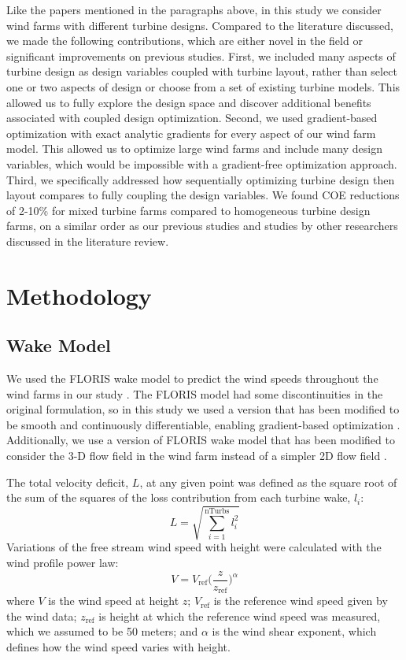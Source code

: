 \documentclass[WESD, manuscript]{copernicus}
\begin{document}
Like the papers mentioned in the paragraphs above, in this study we consider wind farms with different turbine designs. 
Compared to the literature discussed, we made the following contributions, which are either novel in the field or significant improvements on previous studies.
First, we included many aspects of turbine design as design variables coupled with turbine layout, rather than select one or two aspects of design or choose from a set of existing turbine models. This allowed us to fully explore the design space and discover additional benefits associated with coupled design optimization.
Second, we used gradient-based optimization with exact analytic gradients for every aspect of our wind farm model. This allowed us to optimize large wind farms and include many design variables, which would be impossible with a gradient-free optimization approach.
Third, we specifically addressed how sequentially optimizing turbine design then layout compares to fully coupling the design variables.
%
We found COE reductions of 2-10\% for mixed turbine farms compared to homogeneous turbine design farms, on a similar order as our previous studies and studies by other researchers discussed in the literature review.








\section{Methodology}

	\subsection{Wake Model}
	We used the FLORIS wake model to predict the wind speeds throughout the wind farms in our study \citep{gebraad2016wind}. 
The FLORIS model had some discontinuities in the original formulation, so in this study we used a version that has been modified to be smooth and continuously differentiable, enabling gradient-based optimization \citep{thomas2017improving}. 
Additionally, we use a version of FLORIS wake model that has been modified to consider the 3-D flow field in the wind farm instead of a simpler 2D flow field \citep{stanley2017gradient}.

The total velocity deficit, $L$, at any given point was defined as the square root of the sum of the squares of the loss contribution from each turbine wake, $l_i$:
\begin{equation}
L = \sqrt{\sum_{i=1}^\text{nTurbs}l_i^2}
\end{equation}
\noindent Variations of the free stream wind speed with height were calculated with the wind profile power law: 
\begin{equation}
V = V_{\text{ref}}\Big(\frac{z}{z_{\text{ref}}}\Big)^\alpha
\label{Eq:shear}
\end{equation}
where $V$ is the wind speed at height $z$; $V_{\text{ref}}$ is the reference wind speed given by the wind data; $z_{\text{ref}}$ is height at which the reference wind speed was measured, which we assumed to be 50 meters;  and $\alpha$ is the wind shear exponent, which defines how the wind speed varies with height.
      
\end{document}
